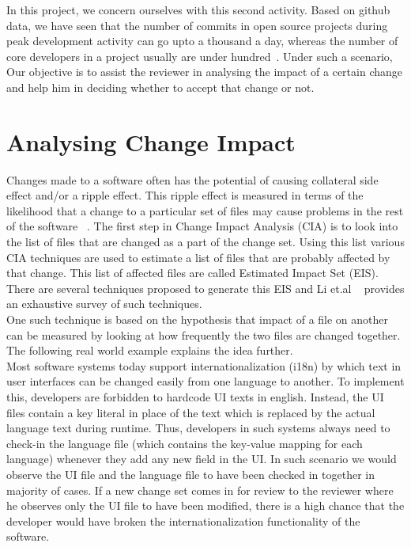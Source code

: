 In this project, we concern ourselves with this second activity. Based on github data, we have seen that the number of commits in open source projects during peak development activity can go upto a thousand a day, whereas the number of core developers in a project usually are under hundred~\cite{YoshikawaIS14}. Under such a scenario, Our objective is to assist the reviewer in analysing the impact of a certain change and help him in deciding whether to accept that change or not.\\

\section{Analysing Change Impact}

Changes made to a software often has the potential of causing collateral side effect and/or a ripple effect. This ripple effect is measured in terms of the likelihood that a change to a particular set of files may cause problems in the rest of the software ~\cite{STVSTVR1475}. The first step in Change Impact Analysis (CIA) is to look into the list of files that are changed as a part of the change set. Using this list various CIA techniques are used to estimate a list of files that are probably affected by that change. This list of affected files are called Estimated Impact Set (EIS). There are several techniques proposed to generate this EIS and Li et.al ~\cite{STVSTVR1475} provides an exhaustive survey of such techniques.\\
One such technique is based on the hypothesis that impact of a file on another can be measured by looking at how frequently the two files are changed together. The following real world example explains the idea further.\\
Most software systems today support internationalization (i18n) by which text in user interfaces can be changed easily from one language to another. To implement this, developers are forbidden to hardcode UI texts in english. Instead, the UI files contain a key literal in place of the text which is replaced by the actual language text during runtime. Thus, developers in such systems always need to check-in the language file (which contains the key-value mapping for each language) whenever they add any new field in the UI. In such scenario we would observe the UI file and the language file to have been checked in together in majority of cases. If a new change set comes in for review to the reviewer where he observes only the UI file to have been modified, there is a high chance that the developer would have broken the internationalization functionality of the software.\\

